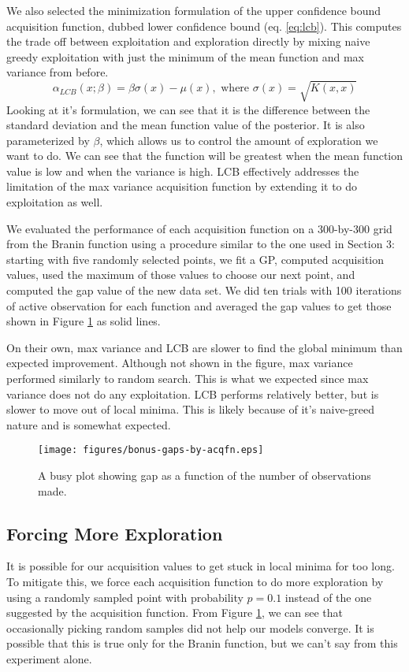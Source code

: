 \documentclass[11pt]{article}
\numberwithin{equation}{section}
\begin{document}
We also selected the minimization formulation of the upper confidence bound acquisition function, dubbed lower confidence bound (eq. \ref{eq:lcb}). This  computes the trade off between exploitation and exploration directly by mixing naive greedy exploitation with just the minimum of the mean function and max variance from before.
\begin{equation}
  \alpha_{LCB}(x; \beta) = \beta \sigma(x) - \mu(x), \text{ where } \sigma(x) = \sqrt{K(x, x)}
  \label{eq:lcb}
\end{equation}
Looking at it's formulation, we can see that it is the difference between the
standard deviation and the mean function value of the posterior. It is also
parameterized by $\beta$, which allows us to control the amount of
exploration we want to do. We can see that the function will be greatest when
the mean function value is low and when the variance is high. LCB effectively
addresses the limitation of the max variance acquisition function by
extending it to do exploitation as well.

We evaluated the performance of each acquisition function on a 300-by-300
grid from the Branin function using a procedure similar to the one used in
Section 3: starting with five randomly selected points, we fit a GP, computed
acquisition values, used the maximum of those values to choose our next
point, and computed the gap value of the new data set. We did ten trials with
100 iterations of active observation for each function and averaged the gap
values to get those shown in Figure \ref{fig:bonus-gaps} as solid lines.

On their own, max variance and LCB are slower to find the global minimum than
expected improvement. Although not shown in the figure, max variance
performed similarly to random search. This is what we expected since max
variance does not do any exploitation. LCB performs relatively better, but is
slower to move out of local minima. This is likely because of it's
naive-greed nature and is somewhat expected.

\begin{figure}[h]
  \centering
  \texttt{[image: figures/bonus-gaps-by-acqfn.eps]}
  \caption{A busy plot showing gap as a function of the number of
  observations made.}
  \label{fig:bonus-gaps}
\end{figure}

\subsection*{Forcing More Exploration}
It is possible for our acquisition values to get stuck in local minima for too long. To mitigate this, we force each acquisition function to do more exploration by using a randomly sampled point with probability $p = 0.1$ instead of the one suggested by the acquisition function. From Figure \ref{fig:bonus-gaps}, we can see that occasionally picking random samples did not help our models converge. It is possible that this is true only for the Branin function, but we can't say from this experiment alone.
\end{document}
